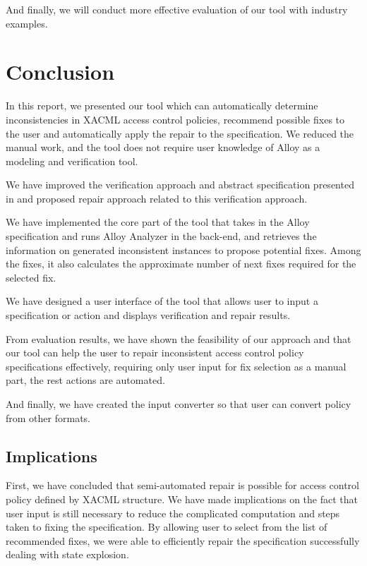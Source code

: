 \documentclass{acm_proc_article-sp}
\begin{document}
And finally, we will conduct more effective evaluation of our tool with industry examples.

\section{Conclusion}

In this report, we presented our tool which can automatically determine inconsistencies in XACML access control policies, recommend possible fixes to the user and automatically apply the repair to the specification. We reduced the manual work, and the tool does not require user knowledge of Alloy as a modeling and verification tool.

We have improved the verification approach and abstract specification presented in \cite{acp:alloy} and proposed repair approach related to this verification approach.

We have implemented the core part of the tool that takes in the Alloy specification and runs Alloy Analyzer in the back-end, and retrieves the information on generated inconsistent instances to propose potential fixes. Among the fixes, it also calculates the approximate number of next fixes required for the selected fix. 

We have designed a user interface of the tool that allows user to input a specification or action and displays verification and repair results. 

From evaluation results, we have shown the feasibility of our approach and that our tool can help the user to repair inconsistent access control policy specifications effectively, requiring only user input for fix selection as a manual part, the rest actions are automated. 

And finally, we have created the input converter so that user can convert policy from other formats. 

\subsection{Implications}

First, we have concluded that semi-automated repair is possible for access control policy defined by XACML structure. 
We have made implications on the fact that user input is still necessary to reduce the complicated computation and steps taken to fixing the specification. By allowing user to select from the list of recommended fixes, we were able to efficiently repair the specification successfully dealing with state explosion.
\end{document}
